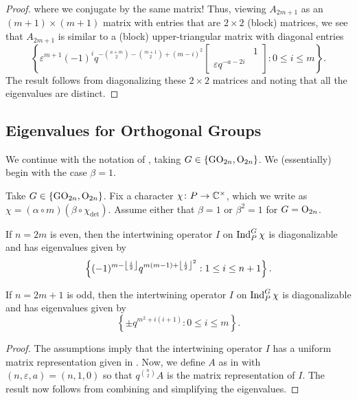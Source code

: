 \begin{proof}
    where we conjugate by the same matrix! Thus, viewing $A_{2m+1}$ as an $(m+1)\times(m+1)$ matrix with entries that are $2\times2$ (block) matrices, we see that $A_{2m+1}$ is similar to a (block) upper-triangular matrix with diagonal entries
    \[\left\{\varepsilon^{m+1}(-1)^iq^{-\binom{a+m}2-\binom{m+1}2+(m-i)^2}\begin{bmatrix}
        & 1 \\
        \varepsilon q^{-a-2i}
    \end{bmatrix}:0\le i\le m\right\}.\]
    The result follows from diagonalizing these $2\times2$ matrices and noting that all the eigenvalues are distinct.
\end{proof}

\subsection{Eigenvalues for Orthogonal Groups}
We continue with the notation of , taking $G\in\{\mathrm{GO}_{2n},\mathrm{O}_{2n}\}$. We (essentially) begin with the case $\beta=1$.
\begin{theorem} \label{thm:o-trivial-eigens}
    Take $G\in\{\mathrm{GO}_{2n},\mathrm{O}_{2n}\}$. Fix a character $\chi\colon P\to\mathbb C^\times$, which we write as $\chi=(\alpha\circ m)(\beta\circ\chi_{\det})$. Assume either that $\beta=1$ or $\beta^2=1$ for $G=\mathrm{O}_{2n}$.
    \begin{listalph}
        \item If $n=2m$ is even, then the intertwining operator $I$ on $\operatorname{Ind}_P^G\chi$ is diagonalizable and has eigenvalues given by
        \[\left\{(-1)^{m-\left\lfloor{\frac i2}\right\rfloor}q^{m(m-1)+\left\lfloor{\frac i2}\right\rfloor^2}:1\le i\le n+1\right\}.\]
        \item If $n=2m+1$ is odd, then the intertwining operator $I$ on $\operatorname{Ind}_P^G\chi$ is diagonalizable and has eigenvalues given by
        \[\left\{\pm q^{m^2+i(i+1)}:0\le i\le m\right\}.\]
    \end{listalph}
\end{theorem}
\begin{proof}
    The assumptions imply that the intertwining operator $I$ has a uniform matrix representation given in . Now, we define $A$ as in  with $(n,\varepsilon,a)=(n,1,0)$ so that $q^{\binom n2}A$ is the matrix representation of $I$. The result now follows from combining  and simplifying the eigenvalues.
\end{proof}
